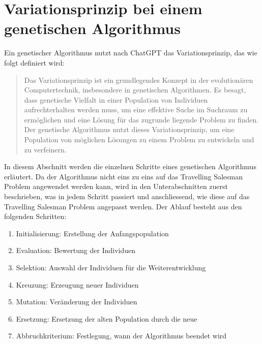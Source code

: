 %
%
%
%
\section{Variationsprinzip bei einem genetischen Algorithmus
\label{buch:paper:varalg:section:genetic_algorithm_process}}
Ein genetischer Algorithmus nutzt nach ChatGPT das Variationsprinzip, 
das wie folgt definiert wird:
\begin{quote}
Das Variationsprinzip ist ein grundlegendes Konzept in der 
evolutionären Computertechnik, insbesondere in genetischen 
Algorithmen. Es besagt, dass genetische Vielfalt in einer 
Population von Individuen aufrechterhalten werden muss, 
um eine effektive Suche im Suchraum zu ermöglichen und eine 
Lösung für das zugrunde liegende Problem zu finden.
\\
Der genetische Algorithmus nutzt dieses Variationsprinzip, um eine 
Population von möglichen Lösungen zu einem Problem zu entwickeln 
und zu verfeinern\cite{chatgpt2024}.
\end{quote}
In diesem Abschnitt werden die einzelnen Schritte eines genetischen Algorithmus 
erläutert. Da der Algorithmus nicht eins zu eins auf das Travelling Salesman
Problem angewendet werden kann, wird in den Unterabschnitten zuerst beschrieben,
was in jedem Schritt passiert und anschliessend, wie diese auf das Travelling 
Salesman Problem angepasst werden.
Der Ablauf besteht aus den folgenden Schritten:
\begin{enumerate}
    \item Initialisierung: Erstellung der Anfangspopulation
    \item Evaluation: Bewertung der Individuen
    \item Selektion: Auswahl der Individuen für die Weiterentwicklung
    \item Kreuzung: Erzeugung neuer Individuen
    \item Mutation: Veränderung der Individuen
    \item Ersetzung: Ersetzung der alten Population durch die neue
    \item Abbruchkriterium: Festlegung, wann der Algorithmus beendet wird
\end{enumerate}








